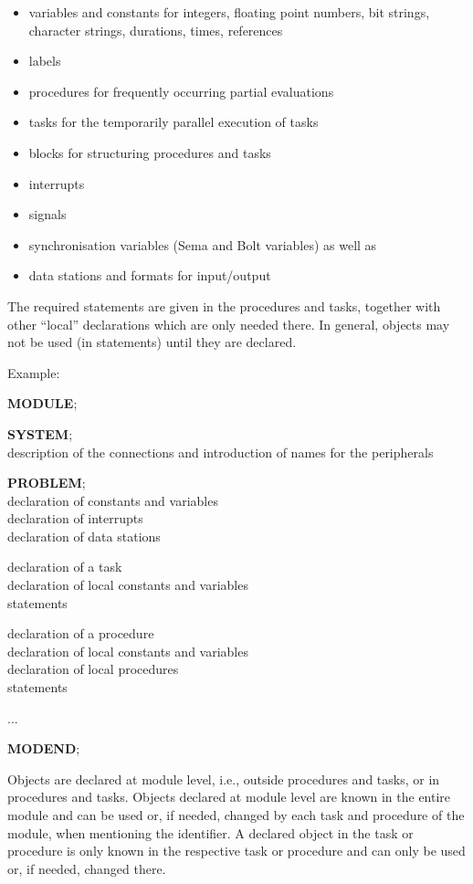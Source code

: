 \begin{itemize}
\item variables and constants for integers, floating point numbers, bit
strings, character strings, durations, times, references
\item labels
\item procedures for frequently occurring partial evaluations
\item tasks for the temporarily parallel execution of tasks
\item blocks for structuring procedures and tasks
\item interrupts
\item signals
\item synchronisation variables (Sema and Bolt variables) as well as
\item data stations and formats for input/output
\end{itemize}

The required statements are given in the procedures and tasks,
together with other ``local'' declarations which are only needed there.
In general, objects may not be used (in statements) until they are
declared.

Example:

{\bf MODULE};

{\bf SYSTEM};\\
\x description of the connections and introduction of names for the
peripherals

{\bf PROBLEM};\\
\x declaration of constants and variables\\
\x declaration of interrupts\\
\x declaration of data stations

\x declaration of a task\\
\x \x declaration of local constants and variables\\
\x \x statements

\x declaration of a procedure\\
\x \x declaration of local constants and variables\\
\x \x declaration of local procedures\\
\x \x statements

...

{\bf MODEND};

Objects are declared at module level, i.e., outside procedures and
tasks, or in procedures and tasks. Objects declared at module level are
known in the entire module and can be used or, if needed, changed by
each task and procedure of the module, when mentioning the identifier.
A declared object in the task or procedure is only known in the
respective task or procedure and can only be used or, if needed,
changed there.

